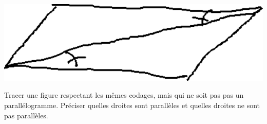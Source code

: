
\begin{exercice}\label{exo2smath-0325}

    \includegraphics[width=0.5\linewidth]{codage_parall1.pdf}      %

    Tracer une figure respectant les mêmes codages, mais qui ne soit pas pas un parallélogramme. Préciser quelles droites sont parallèles et quelles droites ne sont pas parallèles.

\end{exercice}
